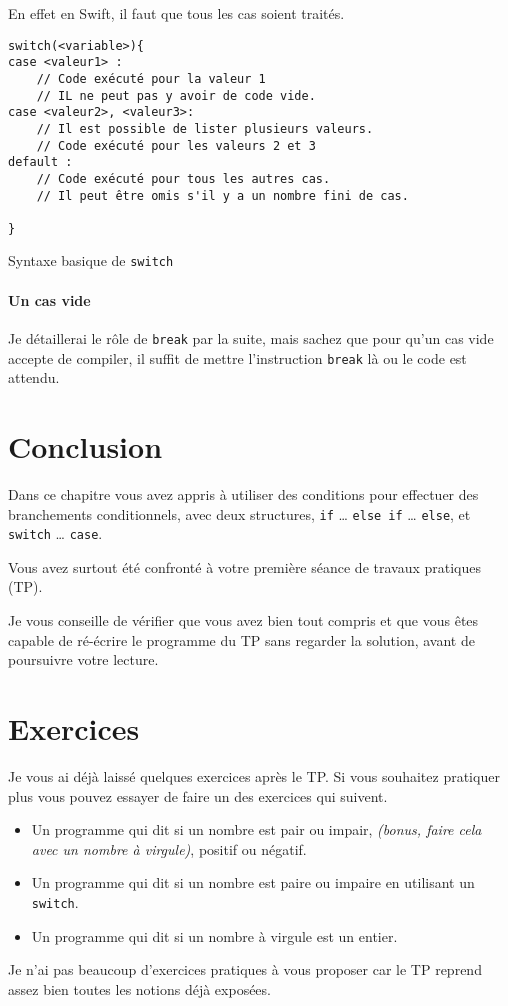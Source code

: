 En effet en Swift, il faut que tous les cas soient traités.
\begin{listing}[h]
\begin{verbatim}
switch(<variable>){
case <valeur1> :
    // Code exécuté pour la valeur 1
    // IL ne peut pas y avoir de code vide.
case <valeur2>, <valeur3>:
    // Il est possible de lister plusieurs valeurs.
    // Code exécuté pour les valeurs 2 et 3
default :
    // Code exécuté pour tous les autres cas.
    // Il peut être omis s'il y a un nombre fini de cas.

}
\end{verbatim}
\caption{Syntaxe basique de \texttt{switch}}
\end{listing}
\paragraph{Un cas vide}
Je détaillerai le rôle de \texttt{break} par la suite, mais sachez que pour qu'un cas vide accepte de compiler, il suffit de mettre l'instruction \texttt{break} là ou le code est attendu.


\section*{Conclusion}
{}
Dans ce chapitre vous avez appris à utiliser des conditions pour effectuer des branchements conditionnels, avec deux structures, \texttt{if} … \texttt{else if} … \texttt{else}, et \texttt{switch} … \texttt{case}.

Vous avez surtout été confronté à votre première séance de travaux pratiques (TP).

Je vous conseille de vérifier que vous avez bien tout compris et que vous êtes capable de ré-écrire le programme du TP sans regarder la solution, avant de poursuivre votre lecture.

\section*{Exercices}
{}
Je vous ai déjà laissé quelques exercices après le TP.
Si vous souhaitez pratiquer plus vous pouvez essayer de faire un des exercices qui suivent.
\begin{itemize}
\item Un programme qui dit si un nombre est pair ou impair,
\emph{(bonus, faire cela avec un nombre à virgule)}, positif ou négatif.
\item Un programme qui dit si un nombre est paire ou impaire en utilisant un \texttt{switch}.
\item Un programme qui dit si un nombre à virgule est un entier.
\end{itemize}

Je n'ai pas beaucoup d'exercices pratiques à vous proposer car le TP reprend assez bien toutes les notions déjà exposées.

